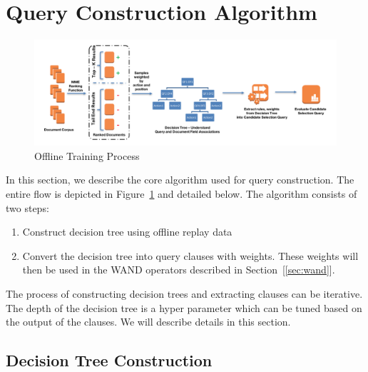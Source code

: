 \section{Query Construction Algorithm}

\begin{figure}
\centering
\includegraphics[width=\textwidth]{training-process.png}
\caption{Offline Training Process}
\label{fig:offline-training-process}
\end{figure}


In this section, we describe the core algorithm used for query construction.
The entire flow is depicted in Figure~\ref{fig:offline-training-process} and
detailed below.
The algorithm consists of two steps:
\begin{enumerate}
    \item Construct decision tree using offline replay data
    \item Convert the decision tree into query clauses with weights. These
    weights will then be used in the WAND operators described in Section~[\ref{sec:wand}].
\end{enumerate}

The process of constructing decision trees and extracting clauses can be iterative. The depth of the decision tree is a hyper
parameter which can be tuned based on the output of the clauses. We will
describe details in this section.

\subsection{Decision Tree Construction}

